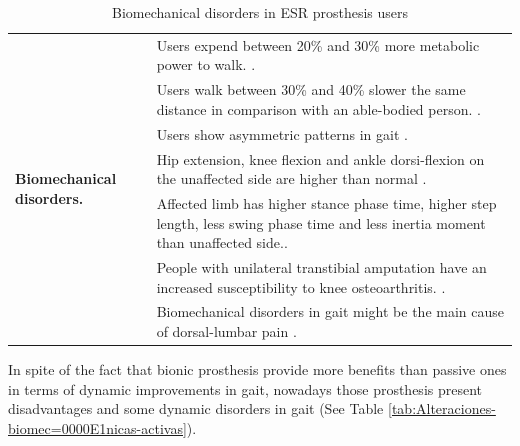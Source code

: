 \documentclass[12pt,english]{article}
\providecommand{\tabularnewline}{\\}
\begin{document}
\begin{center}
\begin{table}[H]
\caption{\label{tab:Alteraciones-biomec=0000E1nicas-ESR}Biomechanical disorders in ESR prosthesis users}


\centering{}%
\begin{tabular}{|l|>{\centering}p{15cm}|}
\hline 
\multirow{8}{*}[-17mm]{\begin{turn}{90}
\textbf{Biomechanical disorders.}
\end{turn}} & Users expend between 20\% and 30\% more metabolic power to walk.
\cite{Au2009,Schmalz2002}.\tabularnewline
\cline{2-2} 
 & Users walk between 30\% and 40\% slower the same distance in comparison with an able-bodied person. \cite{Au2009,Buckley1997,Herr2010,Gates2013,Hill2013a,Schmalz2002}.\tabularnewline
\cline{2-2} 
 & Users show asymmetric patterns in gait \cite{Au2009,Martinez-Villalpando2011,Hill2013a}.\tabularnewline
\cline{2-2} 
 &  Hip extension, knee flexion and ankle dorsi-flexion on the unaffected side are higher than normal \cite{Morgenroth2011, Bateni2002}. \tabularnewline
\cline{2-2}
& Affected limb has higher stance phase time, higher step length, less swing phase time and less inertia moment than unaffected side.\cite{Mattes2000}.\tabularnewline
\cline{2-2} 
 & People with unilateral transtibial amputation have an increased susceptibility to knee osteoarthritis. \cite{Grabowski2013}.\tabularnewline
\cline{2-2} 
& Biomechanical disorders in gait might be the main cause of dorsal-lumbar pain \cite{Devan2014}. \tabularnewline
\hline 
\end{tabular}
\end{table}

\par\end{center}

In spite of the fact that bionic prosthesis provide more benefits than passive ones in terms of dynamic improvements in gait, nowadays those prosthesis present disadvantages and some dynamic disorders in gait (See Table \ref{tab:Alteraciones-biomec=0000E1nicas-activas}).  
\end{document}
